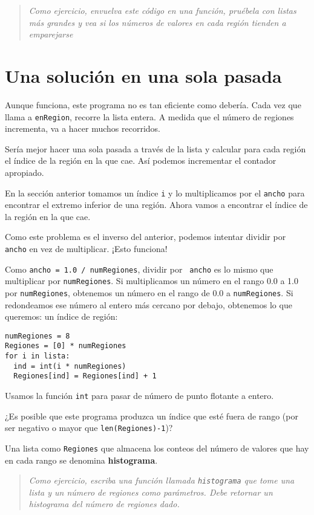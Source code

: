 \begin{quote}
{\em Como ejercicio, envuelva este código en una función, 
pruébela con listas más grandes y vea si los números
de valores en cada región tienden a emparejarse}
\end{quote}


\section{Una solución en una sola pasada}

Aunque funciona, este programa no es tan eficiente como debería.
Cada vez que llama a \texttt{enRegion}, recorre la lista entera.  A medida
que el número de regiones incrementa, va a hacer muchos
recorridos.

Sería mejor hacer una sola pasada a través de la lista y calcular
para cada región el índice de la región en la que cae. Así podemos
incrementar el contador apropiado.

En la sección anterior tomamos un índice \texttt{i} y lo multiplicamos
por el \texttt{ancho} para encontrar el extremo inferior de una región. 
Ahora vamos a encontrar el índice de la región en la que cae.

Como este problema es el inverso del anterior, podemos intentar
dividir por \texttt{ancho} en vez de multiplicar. ¡Esto funciona!

Como \texttt{ancho = 1.0 / numRegiones}, dividir por {\tt
ancho} es lo mismo que multiplicar por \texttt{numRegiones}.  Si 
multiplicamos un número en el rango 0.0 a 1.0 por \texttt{numRegiones}, 
obtenemos un número en el rango de  0.0 a \texttt{numRegiones}.  Si 
redondeamos ese número al entero más cercano por debajo, obtenemos
lo que queremos: un índice de región:

\beforeverb
\begin{verbatim}
numRegiones = 8
Regiones = [0] * numRegiones
for i in lista:
  ind = int(i * numRegiones)
  Regiones[ind] = Regiones[ind] + 1
\end{verbatim}
\afterverb
%
Usamos la función  \texttt{int} para pasar de número de punto flotante
a entero.

¿Es posible que este programa produzca un índice que esté fuera
de rango (por ser negativo o mayor que \texttt{len(Regiones)-1})?

Una lista como  \texttt{Regiones} que almacena los conteos del número
de valores que hay en cada rango se denomina {\bf histograma}.

\begin{quote}
{\em Como ejercicio, escriba una función llamada \texttt{histograma} que
tome una lista y un número de regiones como parámetros. Debe retornar
un histograma del número de regiones dado.}
\end{quote}

